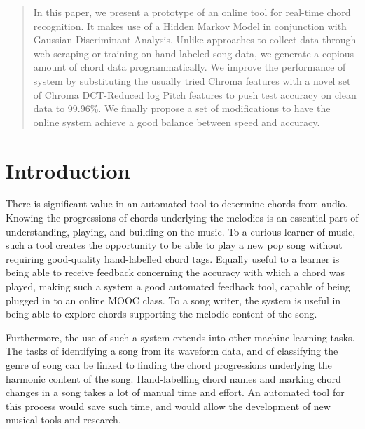 \documentclass{article}
\begin{document}
 


\begin{abstract} 
In this paper, we present a prototype of an online tool for real-time chord recognition. It makes use of a Hidden Markov Model in conjunction with Gaussian Discriminant Analysis. Unlike approaches to collect data through web-scraping or training on hand-labeled song data, we generate a copious amount of chord data programmatically. We improve the performance of system by substituting the usually tried Chroma features with a novel set of Chroma DCT-Reduced log Pitch features to push test accuracy on clean data to 99.96\%. We finally propose a set of modifications to have the online system achieve a good balance between speed and accuracy.
\end{abstract} 

\section{Introduction}
\label{intro}
There is significant value in an automated tool to determine chords from audio. Knowing the progressions of chords underlying the melodies is an essential part of understanding, playing, and building on the music. To a curious learner of music, such a tool creates the opportunity to be able to play a new pop song without requiring good-quality hand-labelled chord tags. Equally useful to a learner is being able to receive feedback concerning the accuracy with which a chord was played, making such a system a good automated feedback tool, capable of being plugged in to an online MOOC class. To a song writer, the system is useful in being able to explore chords supporting the melodic content of the song.

Furthermore, the use of such a system extends into other machine learning tasks. The tasks of identifying a song from its waveform data, and of classifying the genre of song can be linked to finding the chord progressions underlying the harmonic content of the song. Hand-labelling chord names and marking chord changes in a song takes a lot of manual time and effort. An automated tool for this process would save such time, and would allow the development of new  musical tools and research.
\end{document}
